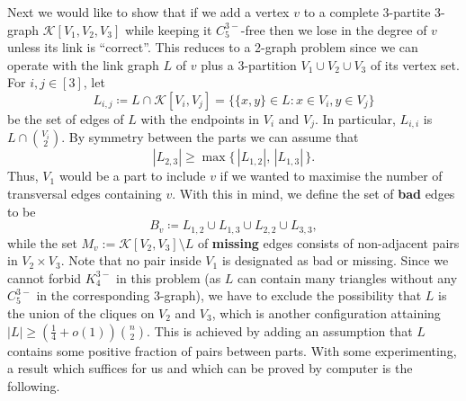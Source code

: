 \documentclass[11pt,a4paper]{article}
\theoremstyle{remark}
\newcommand{\C}[1]{\mathcal{#1}}
\begin{document}
Next we would like to show that if we add a vertex $v$ to a complete 3-partite 3-graph $\mathcal{K}[V_1, V_2, V_3]$ while keeping it $C_{5}^{3-}$-free then we lose in the degree of $v$ unless its link is ``correct''. This reduces to a 2-graph problem since we can operate with the link graph $L$ of $v$ plus a 3-partition $V_1\cup V_2\cup V_3$ of its vertex set. For $i,j\in [3]$, let $$
 L_{i,j}\coloneqq L\cap \C K[V_i,V_j]=\{\{x,y\}\in L\colon  x\in V_i, y\in V_j\}
 $$ be the set of edges of $L$ with the endpoints in $V_i$ and $V_j$. In particular, $L_{i,i}$ is $L\cap {V_i\choose 2}$.
By symmetry between the parts we can assume that
\begin{equation}\label{eq:L23}
|L_{2,3}|\ge \max\{\,|L_{1,2}|,\, |L_{1,3}|\,\}.
\end{equation}
Thus,  $V_1$ would be a part to include $v$ if we wanted to maximise the number of transversal edges containing $v$. With this in mind, we define the set of \textbf{bad} edges to be
 \begin{equation}\label{eq:GraphB}
  B_{v}\coloneqq L_{1,2}\cup L_{1,3}\cup L_{2,2}\cup L_{3,3},
  \end{equation}
 while the set $M_{v}:=\C K[V_2,V_3]\setminus L$ of \textbf{missing} edges consists of non-adjacent pairs in $V_2\times V_3$. Note that no pair inside $V_1$ is designated as bad or missing.
Since we cannot forbid $K_{4}^{3-}$ in this problem (as $L$ can contain many triangles without any $C_{5}^{3-}$ in the corresponding $3$-graph), we have to exclude the possibility that $L$ is the union of the cliques on $V_2$ and $V_3$, which is another configuration attaining $|L|\ge (\frac14+o(1)){n\choose 2}$. This is achieved by adding an assumption that $L$ contains some positive fraction of pairs between parts. With some experimenting, a result which suffices for us and which can be proved by computer is the following.
\end{document}
